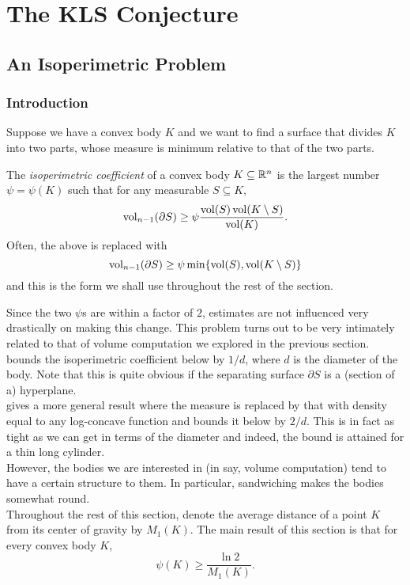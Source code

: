 \section{The KLS Conjecture}

\subsection{An Isoperimetric Problem}

\subsubsection{Introduction}

Suppose we have a convex body $K$ and we want to find a surface that divides $K$ into two parts, whose measure is minimum relative to that of the two parts.

\begin{fdef}
	The \textit{isoperimetric coefficient} of a convex body $K\subseteq\mathbb{R}^n$ is the largest number $\psi=\psi(K)$ such that for any measurable $S\subseteq K$,
	\[ \operatorname{vol}_{n-1}(\partial S) \geq \psi \frac{\operatorname{vol}(S)\operatorname{vol}(K\setminus S)}{\operatorname{vol}(K)}. \]
	Often, the above is replaced with
	\[ \operatorname{vol}_{n-1}(\partial S) \geq \psi \min\{\operatorname{vol}(S), \operatorname{vol}(K\setminus S)\} \]
	and this is the form we shall use throughout the rest of the section.
\end{fdef}

Since the two $\psi$s are within a factor of $2$, estimates are not influenced very drastically on making this change. This problem turns out to be very intimately related to that of volume computation we explored in the previous section.\\
\cite{lovasz-simonovits-mixing-rate-isoperimetric} bounds the isoperimetric coefficient below by $1/d$, where $d$ is the diameter of the body. Note that this is quite obvious if the separating surface $\partial S$ is a (section of a) hyperplane.\\
\cite{applegate-kannan-cube-sandwich} gives a more general result where the measure is replaced by that with density equal to any log-concave function and bounds it below by $2/d$. This is in fact as tight as we can get in terms of the diameter and indeed, the bound is attained for a thin long cylinder.\\
However, the bodies we are interested in (in say, volume computation) tend to have a certain structure to them. In particular, sandwiching makes the bodies somewhat round.\\
Throughout the rest of this section, denote the average distance of a point $K$ from its center of gravity by $M_1(K)$. The main result of this section is that for every convex body $K$,
\[ \psi(K) \geq \frac{\ln 2}{M_1(K)}. \]

